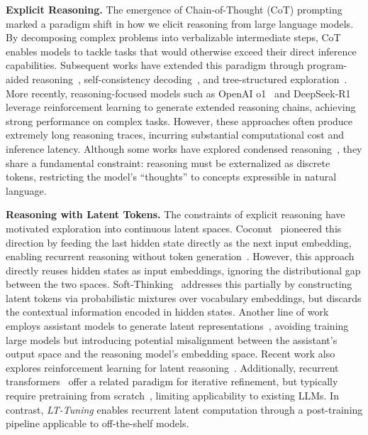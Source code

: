 \documentclass{article}
\theoremstyle{plain}
\theoremstyle{definition}
\theoremstyle{remark}
\begin{document}
\textbf{Explicit Reasoning.} The emergence of Chain-of-Thought (CoT) prompting~\citep{wei2022chain} marked a paradigm shift in how we elicit reasoning from large language models. By decomposing complex problems into verbalizable intermediate steps, CoT enables models to tackle tasks that would otherwise exceed their direct inference capabilities. Subsequent works have extended this paradigm through program-aided reasoning~\citep{chen2022program}, self-consistency decoding~\citep{wangself}, and tree-structured exploration~\citep{yao2024tree}. More recently, reasoning-focused models such as OpenAI o1~\citep{jaech2024openai} and DeepSeek-R1~\citep{guo2025deepseek} leverage reinforcement learning to generate extended reasoning chains, achieving strong performance on complex tasks. However, these approaches often produce extremely long reasoning traces, incurring substantial computational cost and inference latency. Although some works have explored condensed reasoning~\citep{deng2023implicit,cheng2024compressed}, they share a fundamental constraint: reasoning must be externalized as discrete tokens, restricting the model's ``thoughts'' to concepts expressible in natural language.

\textbf{Reasoning with Latent Tokens.}
The constraints of explicit reasoning have motivated exploration into continuous latent spaces. Coconut~\citep{hao2024training} pioneered this direction by feeding the last hidden state directly as the next input embedding, enabling recurrent reasoning without token generation~\citep{shen2025codi,wei2025sim}. However, this approach directly reuses hidden states as input embeddings, ignoring the distributional gap between the two spaces. Soft-Thinking~\citep{zhang2025soft,zhou2025geometry} addresses this partially by constructing latent tokens via probabilistic mixtures over vocabulary embeddings, but discards the contextual information encoded in hidden states. Another line of work employs assistant models to generate latent representations~\citep{xu2025softcot,hesemcot}, avoiding training large models but introducing potential misalignment between the assistant's output space and the reasoning model's embedding space. Recent work also explores reinforcement learning for latent reasoning~\citep{butt2025soft}. Additionally, recurrent transformers~\citep{dehghani2018universal,yanglooped,gatmiry2024can} offer a related paradigm for iterative refinement, but typically require pretraining from scratch~\citep{zhu2025scaling,bae2025mixture}, limiting applicability to existing LLMs. In contrast, \textit{LT-Tuning} enables recurrent latent computation through a post-training pipeline applicable to off-the-shelf models.
\end{document}
